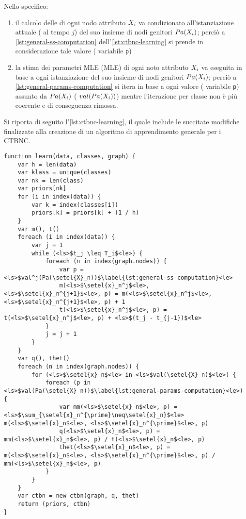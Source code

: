 Nello specifico:
\begin{enumerate}
    \item il calcolo delle \stats{} di ogni nodo attributo $\mathnormal{X}_i$ va condizionato all'istanziazione attuale (\ie{} al tempo $j$) del suo insieme di nodi genitori $Pa(\mathnormal{X}_i)$; perciò a \autoref{lst:general-ss-computation} dell'\autoref{lst:ctbnc-learning} si prende in considerazione tale valore (\ie{} variabile \lstinline[]|p|)
    \item la stima dei parametri \acl{MLE} (\acs{MLE}) di ogni noto attributo $\mathnormal{X}_i$ va eseguita in base a ogni istanziazione del suo insieme di nodi genitori $Pa(\mathnormal{X}_i)$; perciò a \autoref{lst:general-params-computation} si itera in base a ogni valore (\ie{} variabile \lstinline[]|p|) assunto da $Pa(\mathnormal{X}_i)$ (\ie{} $val(Pa(\mathnormal{X}_i))$) mentre l'iterazione per classe non è più coerente e di conseguenza rimossa.
\end{enumerate}
Si riporta di seguito l'\autoref{lst:ctbnc-learning}, il quale include le succitate modifiche finalizzate alla creazione di un algoritmo di apprendimento generale per i \acs{CTBNC}.
\vspace*{8pt}\begin{lstlisting}[caption=Apprendimento di un classificatore \acs{CTBN}, label=lst:ctbnc-learning, language=pseudo]
function learn(data, classes, graph) {
    var h = len(data)
    var klass = unique(classes)
    var nk = len(class)
    var priors[nk]
    for (i in index(data)) {
        var k = index(classes[i])
        priors[k] = priors[k] + (1 / h)
    }
    var m(), t()
    foreach (i in index(data)) {
        var j = 1
        while (<ls>$t_j \leq T_i$<le>) {
            foreach (n in index(graph.nodes)) {
                var p = <ls>$val^j(Pa(\setel{X}_n))$\label{lst:general-ss-computation}<le>
                m(<ls>$\setel{x}_n^j$<le>, <ls>$\setel{x}_n^{j+1}$<le>, p) = m(<ls>$\setel{x}_n^j$<le>, <ls>$\setel{x}_n^{j+1}$<le>, p) + 1
                t(<ls>$\setel{x}_n^j$<le>, p) = t(<ls>$\setel{x}_n^j$<le>, p) + <ls>$(t_j - t_{j-1})$<le>
            }
            j = j + 1
        }
    }
    var q(), thet()
    foreach (n in index(graph.nodes)) {
        for (<ls>$\setel{x}_n$<le> in <ls>$val(\setel{X}_n)$<le>) {
            foreach (p in <ls>$val(Pa(\setel{X}_n))$\label{lst:general-params-computation}<le>) {
                var mm(<ls>$\setel{x}_n$<le>, p) = <ls>$\sum_{\setel{x}_n^{\prime}\neq\setel{x}_n}$<le> m(<ls>$\setel{x}_n$<le>, <ls>$\setel{x}_n^{\prime}$<le>, p)
                q(<ls>$\setel{x}_n$<le>, p) = mm(<ls>$\setel{x}_n$<le>, p) / t(<ls>$\setel{x}_n$<le>, p)
                thet(<ls>$\setel{x}_n$<le>, p) = m(<ls>$\setel{x}_n$<le>, <ls>$\setel{x}_n^{\prime}$<le>, p) / mm(<ls>$\setel{x}_n$<le>, p)
            }
        }
    }
    var ctbn = new ctbn(graph, q, thet)
    return (priors, ctbn)
}
\end{lstlisting}


